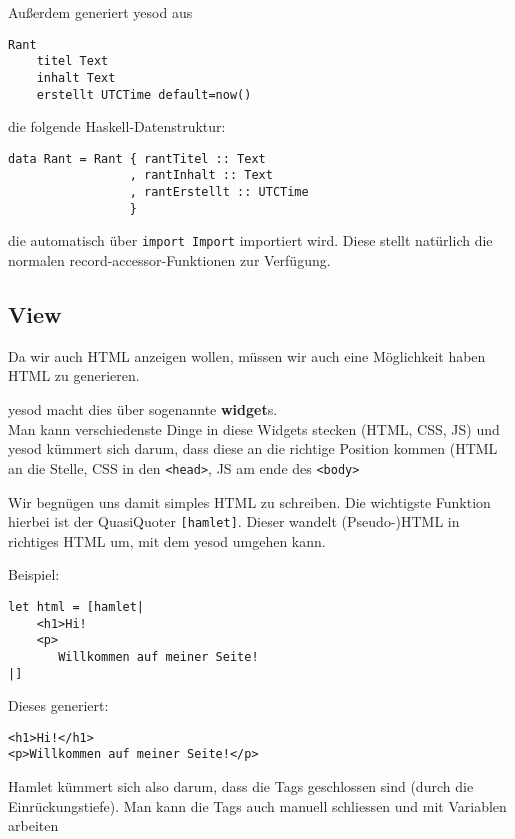 \documentclass{beamer}
\begin{document}
\begin{frame}[fragile]
Außerdem generiert yesod aus
\begin{verbatim}
Rant
    titel Text
    inhalt Text
    erstellt UTCTime default=now()
\end{verbatim}
\pause
die folgende Haskell-Datenstruktur:
\begin{verbatim}
data Rant = Rant { rantTitel :: Text
                 , rantInhalt :: Text
                 , rantErstellt :: UTCTime
                 }
\end{verbatim}
\pause
die automatisch über \texttt{import Import} importiert wird. Diese stellt natürlich die normalen record-accessor-Funktionen zur Verfügung.
\end{frame}

\subsection{View}

\begin{frame}[fragile]
Da wir auch HTML anzeigen wollen, müssen wir auch eine Möglichkeit haben HTML zu generieren.\\\pause\par
yesod macht dies über sogenannte \textbf{widget}s. \\\pause
Man kann verschiedenste Dinge in diese Widgets stecken (HTML, CSS, JS) und yesod kümmert sich darum, dass diese an die richtige Position kommen (HTML an die Stelle, CSS in den \texttt{<head>}, JS am ende des \texttt{<body>}\\\par
\pause
Wir begnügen uns damit simples HTML zu schreiben. Die wichtigste Funktion hierbei ist der QuasiQuoter \texttt{[hamlet]}. Dieser wandelt (Pseudo-)HTML in richtiges HTML um, mit dem yesod umgehen kann.
\end{frame}

\begin{frame}[fragile]
Beispiel:\\\par
\begin{verbatim}
let html = [hamlet|
    <h1>Hi!
    <p>
       Willkommen auf meiner Seite!
|]
\end{verbatim}
\pause
Dieses generiert:
\begin{verbatim}
<h1>Hi!</h1>
<p>Willkommen auf meiner Seite!</p>
\end{verbatim}
\pause
Hamlet kümmert sich also darum, dass die Tags geschlossen sind (durch die Einrückungstiefe). Man kann die Tags auch manuell schliessen und mit Variablen arbeiten
\end{frame}
\end{document}
